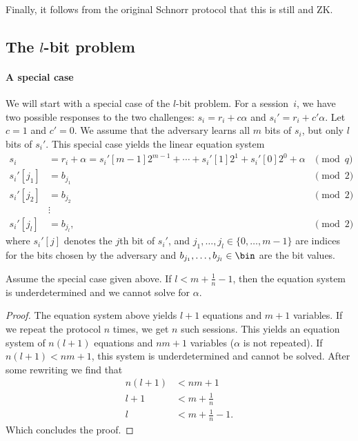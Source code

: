 Finally, it follows from the original Schnorr protocol that this is still  and \ac{ZK}.

\subsection{The \(l\)-bit problem}

\paragraph*{A special case}

We will start with a special case of the \(l\)-bit problem.
For a session~\(i\), we have two possible responses to the two challenges:
\(s_i = r_i + c\alpha\) and \(s_i' = r_i + c'\alpha\).
Let \(c = 1\) and \(c' = 0\).
We assume that the adversary learns all \(m\) bits of \(s_i\), but only \(l\) 
bits of \(s_i'\).
This special case yields the linear equation system
\begin{align*}
  s_i &= r_i + \alpha
  = s_i'[m-1] 2^{m-1} + \dotsb + s_i'[1] 2^1 + s_i'[0] 2^0 + \alpha &\pmod q\\
  s_i'[j_1] &= b_{j_1} &\pmod 2\\
  s_i'[j_2] &= b_{j_2} &\pmod 2\\
            &\vdots \\
  s_i'[j_l] &= b_{j_l}, &\pmod 2
\end{align*}
where \(s_i'[j]\) denotes the \(j\)th bit of \(s_i'\), and \(j_1, \dotsc, 
j_l\in \{0, \dotsc, m-1\}\) are indices for the bits chosen by the adversary 
and \(b_{j_1}, \dotsc, b_{j_l}\in \bin\) are the bit values.

\begin{lemma}
  Assume the special case given above.
  If \(l < m+\frac{1}{n}-1\), then the equation system is underdetermined and 
  we cannot solve for \(\alpha\).
\end{lemma}
\begin{proof}
  The equation system above yields \(l+1\) equations and \(m+1\) variables.
  If we repeat the protocol \(n\) times, we get \(n\) such sessions.
  This yields an equation system of \(n(l+1)\) equations and \(nm+1\) variables 
  (\(\alpha\) is not repeated).
  If \(n(l+1) < nm+1\), this system is underdetermined and cannot be solved.
  After some rewriting we find that
  \begin{align*}
    n(l+1) &< nm+1 \\
    l+1 &< m + \frac{1}{n} \\
    l &< m + \frac{1}{n} -1.
  \end{align*}
  Which concludes the proof.
\end{proof}

